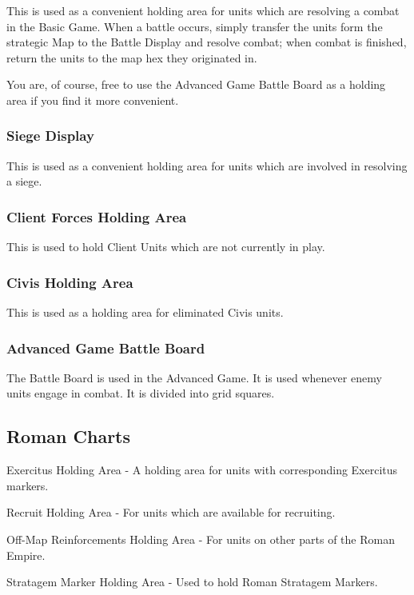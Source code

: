 This is used as a convenient holding area for units which are resolving a combat in the Basic Game. When a battle occurs, simply transfer the units form the strategic Map to the Battle Display and resolve combat; when combat is finished, return the units to the map hex they originated in.

You are, of course, free to use the Advanced Game Battle Board as a holding area if you find it more convenient.

\subsubsection{Siege Display}

This is used as a convenient holding area for units which are involved in resolving a siege.

\subsubsection{Client Forces Holding Area}

This is used to hold Client Units which are not currently in play.

\subsubsection{Civis Holding Area}

This is used as a holding area for eliminated Civis units.

\subsubsection{Advanced Game Battle Board}

The Battle Board is used in the Advanced Game. It is used whenever enemy units engage in combat. It is divided into grid squares.

\subsection{Roman Charts}

Exercitus Holding Area - A holding area for units with corresponding Exercitus markers.

Recruit Holding Area - For units which are available for recruiting.

Off-Map Reinforcements Holding Area - For units on other parts of the Roman Empire.

Stratagem Marker Holding Area - Used to hold Roman Stratagem Markers.

